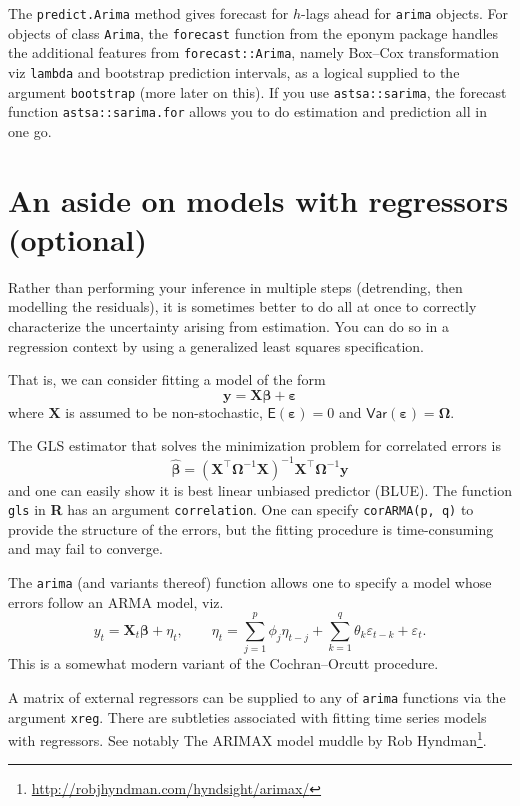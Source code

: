 \documentclass[]{book}
\let\rmarkdownfootnote\footnote%
\def\footnote{\protect\rmarkdownfootnote}
\renewcommand{\href}[2]{#2\footnote{\url{#1}}}
\begin{document}
The \texttt{predict.Arima} method gives forecast for \(h\)-lags ahead for \texttt{arima} objects. For objects of class \texttt{Arima}, the \texttt{forecast} function from the eponym package handles the additional features from \texttt{forecast::Arima}, namely Box--Cox transformation viz \texttt{lambda} and bootstrap prediction intervals, as a logical supplied to the argument \texttt{bootstrap} (more later on this). If you use \texttt{astsa::sarima}, the forecast function \texttt{astsa::sarima.for} allows you to do estimation and prediction all in one go.

\hypertarget{an-aside-on-models-with-regressors-optional}{%
\section{An aside on models with regressors (optional)}\label{an-aside-on-models-with-regressors-optional}}

Rather than performing your inference in multiple steps (detrending, then modelling the residuals), it is sometimes better to do all at once to correctly characterize the uncertainty arising from estimation. You can do so in a regression context by using a generalized least squares specification.

That is, we can consider fitting a model of the form
\[\boldsymbol{y} = \mathbf{X}\boldsymbol{\beta}+\boldsymbol{\varepsilon}\]
where \(\mathbf{X}\) is assumed to be non-stochastic, \(\mathsf{E}(\boldsymbol{\varepsilon}) = 0\) and \(\mathsf{Var}(\boldsymbol{\varepsilon}) = \boldsymbol{\Omega}\).

The GLS estimator that solves the minimization problem for correlated errors is
\[\boldsymbol{\hat{\beta}} = (\mathbf{X}^\top\boldsymbol{\Omega}^{-1}\mathbf{X})^{-1}\mathbf{X}^\top\boldsymbol{\Omega}^{-1}\boldsymbol{y}\]
and one can easily show it is best linear unbiased predictor (BLUE). The function \texttt{gls} in \textbf{R} has an argument \texttt{correlation}. One can specify \texttt{corARMA(p,\ q)} to provide the structure of the errors, but the fitting procedure is time-consuming and may fail to converge.

The \texttt{arima} (and variants thereof) function allows one to specify a model whose errors follow an ARMA model, viz.
\[ y_t = \mathbf{X}_t\boldsymbol{\beta} + \eta_t, \qquad \eta_t = \sum_{j = 1}^p\phi_j\eta_{t-j} + \sum_{k = 1}^q \theta_k\varepsilon_{t-k} + \varepsilon_t.\]
This is a somewhat modern variant of the Cochran--Orcutt procedure.

A matrix of external regressors can be supplied to any of \texttt{arima} functions via the argument \texttt{xreg}. There are subtleties associated with fitting time series models with regressors. See notably \href{http://robjhyndman.com/hyndsight/arimax/}{The ARIMAX model muddle by Rob Hyndman}.
\end{document}
